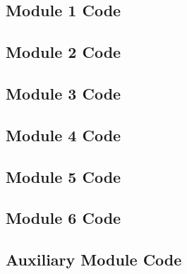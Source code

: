 \documentclass[conf]{new-aiaa} %
\begin{document}


\subsection{Module 1 Code}



\subsection{Module 2 Code}



\subsection{Module 3 Code}



\subsection{Module 4 Code}



\subsection{Module 5 Code}



\subsection{Module 6 Code}



\subsection{Auxiliary Module Code}





\end{document}
